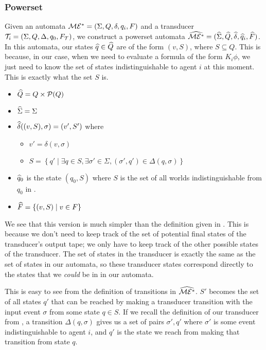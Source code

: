 \documentclass[12pt, a4paper]{article}
\begin{document}
\subsubsection{Powerset}
\label{subsubsec:Powerset}

Given an automata $\mathcal{ME^\ast} = (\Sigma, Q, \delta, q_i, F)$ and a transducer
$\mathcal{T}_i = (\Sigma, Q, \Delta, q_0, F_{\mathcal{T}})$, we construct a
powerset automata $\widehat{\mathcal{ME^\ast}} = (\widehat{\Sigma}, \widehat{Q}, \widehat{\delta}, \widehat{q}_i,
\widehat{F})$. In this automata, our states $\widehat{q} \in \widehat{Q}$ are of the form $(v,
S)$, where $S \subseteq Q$. This is because, in our case, when we need to
evaluate a formula of the form $K_i\phi$, we just need to know the set of states
indistinguishable to agent $i$ at this moment. This is exactly what the set $S$
is.

\begin{itemize}
\item $\widehat{Q} = Q \times \mathcal{P}(Q)$
\item $\widehat{\Sigma} = \Sigma$ 
\item $\widehat{\delta}((v, S), \sigma) = (v', S')$ where
  \begin{itemize}
  \item $v' =  \delta(v, \sigma)$
  \item $S = \left\{q' \mid \exists q \in S, \exists \sigma' \in \Sigma,
      (\sigma', q') \in \Delta(q, \sigma) \right\}$
  \end{itemize}
\item $\widehat{q}_0$ is the state $(q_0, S)$ where $S$ is the set of all worlds
  indistinguishable from $q_0$ in \mestar.
\item $\widehat{F} = \left\{ (v, S) \mid v \in F \right\}$
\end{itemize}

We see that this version is much simpler than the definition given in
. This is because we don't need to keep track of the
set of potential final states of the transducer's output tape; we only have to
keep track of the other possible states of the transducer. The set of states in
the transducer is exactly the same as the set of states in our \mestar automata,
so these transducer states correspond directly to the states that we
\textit{could} be in in our \mestar automata.

This is easy to see from the definition of transitions in $\widehat{\mathcal{ME^\ast}}$.
$S'$ becomes the set of all states $q'$ that can be reached by making a
transducer transition with the input event $\sigma$ from some state $q \in S$.
If we recall the definition of our transducer from
, a transition $\Delta(q, \sigma)$ gives
us a set of pairs $\sigma', q'$ where $\sigma'$ is some event indistinguishable
to agent $i$, and $q'$ is the state we reach from making that transition from
state $q$. 
\end{document}
